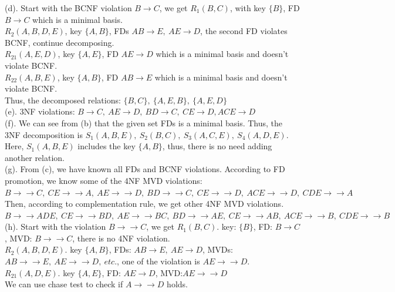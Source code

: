 \documentclass[12pt]{article}
\begin{document}
(d). Start with the BCNF violation $B\rightarrow C$, we get $R_{1}(B,C)$, with key $\{B\}$, FD $B\rightarrow C$ which is a minimal basis.\\
$R_{2}(A,B,D,E)$, key $\{A,B\}$, FDs $AB\rightarrow E,\ AE\rightarrow D$, the second FD violates BCNF, continue decomposing. \\
$R_{21}(A,E,D)$, key $\{A,E\}$, FD $AE\rightarrow D$ which is a minimal basis and doesn't violate BCNF.\\
$R_{22}(A,B,E)$, key $\{A,B\}$, FD $AB\rightarrow E$ which is a minimal basis and doesn't violate BCNF.\\ 
Thus, the decomposed relations: $\{B,C\},\ \{A,E,B\},\ \{A,E,D\}$\\

(e). 3NF violations: $B\rightarrow C,\ AE\rightarrow D,\ BD\rightarrow C,\ CE\rightarrow D, ACE\rightarrow D$\\

(f). We can see from (b) that the given set FDs is a minimal basis. Thus, the 3NF decomposition is $S_{1}(A,B,E),\ S_{2}(B,C),\ S_{3}(A,C,E),\ S_{4}(A,D,E)$. Here, $S_{1}(A,B,E)$ includes the key $\{A,B\}$, thus, there is no need adding another relation.\\

(g). From (c), we have known all FDs and BCNF violations. According to FD promotion, we know some of the 4NF MVD violations: $B\rightarrow\rightarrow C,\ CE\rightarrow\rightarrow A,\ AE\rightarrow\rightarrow D,\ BD\rightarrow\rightarrow C,\ CE\rightarrow\rightarrow D,\ ACE\rightarrow\rightarrow D,\ CDE\rightarrow\rightarrow A$\\
Then, according to complementation rule, we get other 4NF MVD violations. $B\rightarrow\rightarrow ADE,\ CE\rightarrow\rightarrow BD,\ AE\rightarrow\rightarrow  BC,\ BD\rightarrow\rightarrow AE,\ CE\rightarrow\rightarrow AB,\ ACE\rightarrow\rightarrow B,\ CDE\rightarrow\rightarrow B$\\

(h). Start with the violation $B\rightarrow\rightarrow C$, we get $R_{1}(B,C)$. key: $\{B\}$, FD: $B\rightarrow C$, MVD: $B\rightarrow\rightarrow C$, there is no 4NF violation.\\
$R_{2}(A,B,D,E)$. key $\{A,B\}$, FDs: $AB\rightarrow E,\ AE\rightarrow D$, MVDs: $AB\rightarrow\rightarrow E,\ AE\rightarrow\rightarrow D,\ etc.$, one of the violation is $AE\rightarrow\rightarrow D$.\\
$R_{21}(A,D,E)$. key $\{A,E\}$, FD: $AE\rightarrow D$, MVD:$AE\rightarrow\rightarrow D$\\
We can use chase test to check if $A\rightarrow\rightarrow D$ holds.\\
\end{document}
